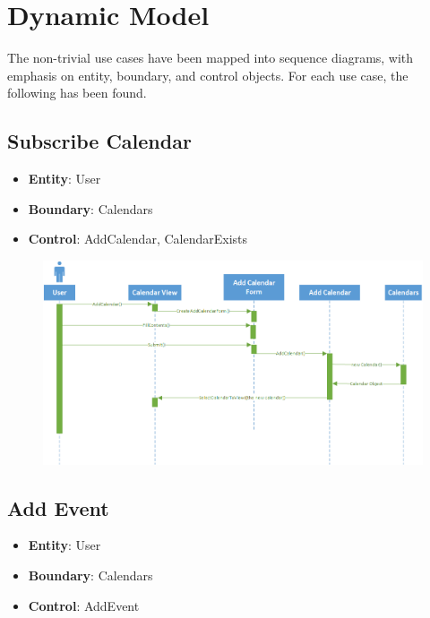\section{Dynamic Model}
The non-trivial use cases have been mapped into sequence diagrams, with emphasis
on entity, boundary, and control objects. For each use case, the following has
been found.

\subsection{Subscribe Calendar}
\begin{itemize}
\item \textbf{Entity}: User
\item \textbf{Boundary}: Calendars
\item \textbf{Control}: AddCalendar, CalendarExists
\end{itemize}

\begin{figure}[h]
\includegraphics[scale=0.8]{subscribe.png}
\end{figure}

\subsection{Add Event}
\begin{itemize}
\item \textbf{Entity}: User
\item \textbf{Boundary}: Calendars
\item \textbf{Control}: AddEvent
\end{itemize}

